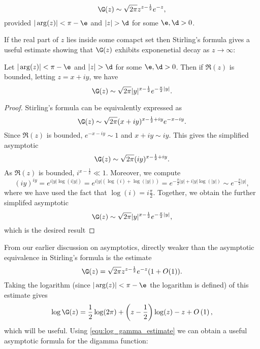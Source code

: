       \begin{theorem}
      \phantom{}
        \[
          \G(z) \sim \sqrt{2\pi}z^{z-\frac{1}{2}}e^{-z},
        \]
        provided $|\arg(z)| < \pi-\e$ and $|z| > \d$ for some $\e,\d > 0$.
      \end{theorem}

      If the real part of $z$ lies inside some comapct set then Stirling's formula gives a useful estimate showing that $\G(z)$ exhibits exponenetial decay as $z \to \infty$:
      
      \begin{corollary}\label{equ:weaker_Stirling_formula}
      Let $|\arg(z)| < \pi-\e$ and $|z| > \d$ for some $\e,\d > 0$. Then if $\Re(z)$ is bounded, letting $z = x+iy$, we have
        \[
          \G(z) \sim \sqrt{2\pi}|y|^{x-\frac{1}{2}}e^{-\frac{\pi}{2}|y|}.
        \]
      \end{corollary}
      \begin{proof}
        Stirling's formula can be equivalently expressed as
        \[
          \G(z) \sim \sqrt{2\pi}(x+iy)^{x-\frac{1}{2}+iy}e^{-x-iy}.
        \]
        Since $\Re(z)$ is bounded, $e^{-x-iy} \sim 1$ and $x+iy \sim iy$. This gives the simplified asymptotic
        \[
          \G(z) \sim \sqrt{2\pi}(iy)^{x-\frac{1}{2}+iy}.
        \]
        As $\Re(z)$ is bounded, $i^{x-\frac{1}{2}} \ll 1$. Moreover, we compute
        \[
          (iy)^{iy} = e^{i|y|\log(i|y|)} = e^{i|y|(\log(i)+\log(|y|))} = e^{-\frac{\pi}{2}|y|+i|y|\log(|y|)} \sim e^{-\frac{\pi}{2}|y|},
        \]
        where we have used the fact that $\log(i) = i\frac{\pi}{2}$. Together, we obtain the further simplifed asymptotic
        \[
          \G(z) \sim \sqrt{2\pi}|y|^{x-\frac{1}{2}}e^{-\frac{\pi}{2}|y|},
        \]
        which is the desired result
      \end{proof}
      From our earlier discussion on asymptotics, directly weaker than the asymptotic equivalence in Stirling's formula is the estimate
      \begin{equation}
          \G(z) = \sqrt{2\pi}z^{z-\frac{1}{2}}e^{-z}(1+O(1)).
      \end{equation}
      Taking the logarithm (since $|\arg(z)| < \pi-\e$ the logarithm is defined) of this estimate gives
      \begin{equation}\label{equ:log_gamma_estimate}
        \log\G(z) = \frac{1}{2}\log(2\pi)+\left(z-\frac{1}{2}\right)\log(z)-z+O\left(1\right),
      \end{equation}
      which will be useful. Using \cref{equ:log_gamma_estimate} we can obtain a useful asymptotic formula for the digamma function:

